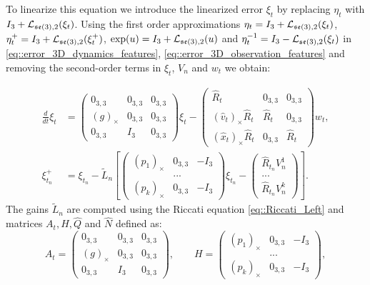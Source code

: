 \documentclass[a4paper,12pt,onecolumn]{article}
\begin{document}
To linearize this equation we introduce the linearized error $\xi_t$ by replacing $\eta_t$ with $I_3 + \mathcal{L}_{\frak{se}(3),2}(\xi_t)$. Using the first order approximations $\eta_t = I_3 + \mathcal{L}_{\frak{se}(3),2}(\xi_t)$, $\eta_t^+ = I_3 + \mathcal{L}_{\frak{se}(3),2}(\xi_t^+)$, $\exp(u)=I_3+\mathcal{L}_{\frak{se}(3),2}(u)$ and $\eta_t^{-1} = I_3 - \mathcal{L}_{\frak{se}(3),2}(\xi_t) $ in \eqref{eq::error_3D_dynamics_features}, \eqref{eq::error_3D_observation_features} and removing the second-order terms in $\xi_t$, $V_n$ and $w_t$ we obtain:

\begin{align*}
\frac{d}{dt} \xi_t & = \begin{pmatrix} 0_{3,3} & 0_{3,3} & 0_{3,3} \\ (g)_\times & 0_{3,3} & 0_{3,3} \\ 0_{3,3} & I_3 & 0_{3,3} \end{pmatrix} \xi_t - \begin{pmatrix} \hat{R}_t & 0_{3,3} & 0_{3,3} \\ (\hat{v}_t)_\times \hat{R}_t & \hat{R}_t & 0_{3,3} \\ (\hat{x}_t)_\times \hat{R}_t & 0_{3,3} & \hat{R}_t \end{pmatrix} w_t, \\
\xi_{t_n}^+ & = \xi_{t_n} - \tilde{L}_n \left[ \begin{pmatrix}  (p_1)_\times & 0_{3,3} & -I_3 \\ & ... & \\ (p_k)_\times & 0_{3,3} & -I_3  \end{pmatrix} \xi_{t_n} - \begin{pmatrix} \hat{R}_{t_n} V_n^1 \\ ... \\  \hat{R}_{t_n} V_n^k \end{pmatrix} \right].
\end{align*}
The gains $\tilde{L}_n$  are computed using the Riccati equation \eqref{eq::Riccati_Left} and matrices $A_t,H, \hat{Q}$ and $\hat{N}$ defined as:
\[
A_t = \begin{pmatrix} 0_{3,3} & 0_{3,3} & 0_{3,3} \\ (g)_\times & 0_{3,3} & 0_{3,3} \\ 0_{3,3} & I_3 & 0_{3,3} \end{pmatrix} , \qquad H = \begin{pmatrix}  (p_1)_\times & 0_{3,3} & -I_3 \\ & ... & \\ (p_k)_\times & 0_{3,3} & -I_3  \end{pmatrix},
\]
\end{document}
